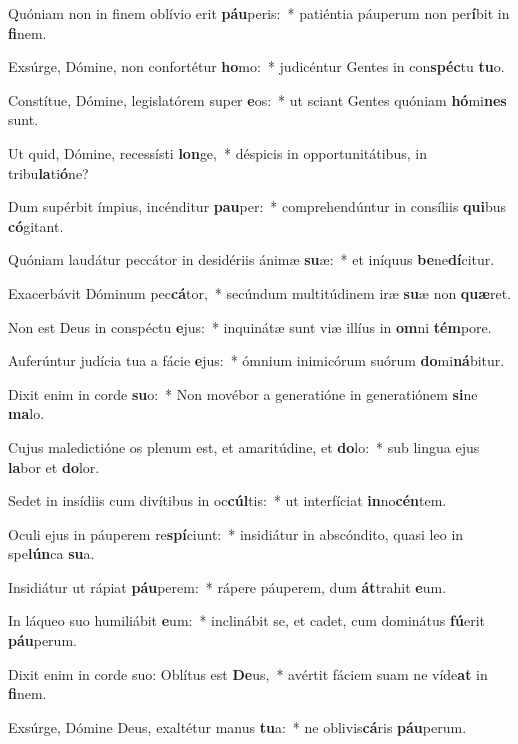 \item Quóniam non in finem oblívio erit \textbf{páu}peris:~* patiéntia páuperum non per\textbf{í}bit in \textbf{fi}nem.
\item Exsúrge, Dómine, non confortétur \textbf{ho}mo:~* judicéntur Gentes in con\textbf{spéc}tu \textbf{tu}o.
\item Constítue, Dómine, legislatórem super \textbf{e}os:~* ut sciant Gentes quóniam \textbf{hó}mi\textbf{nes} sunt.
\item Ut quid, Dómine, recessísti \textbf{lon}ge,~* déspicis in opportunitátibus, in tribu\textbf{la}ti\textbf{ó}ne?
\item Dum supérbit ímpius, incénditur \textbf{pau}per:~* comprehendúntur in consíliis \textbf{qui}bus \textbf{có}gitant.
\item Quóniam laudátur peccátor in desidériis ánimæ \textbf{su}æ:~* et iníquus \textbf{be}ne\textbf{dí}citur.
\item Exacerbávit Dóminum pec\textbf{cá}tor,~* secúndum multitúdinem iræ \textbf{su}æ non \textbf{quæ}ret.
\item Non est Deus in conspéctu \textbf{e}jus:~* inquinátæ sunt viæ illíus in \textbf{om}ni \textbf{tém}pore.
\item Auferúntur judícia tua a fácie \textbf{e}jus:~* ómnium inimicórum suórum \textbf{do}mi\textbf{ná}bitur.
\item Dixit enim in corde \textbf{su}o:~* Non movébor a generatióne in generatiónem \textbf{si}ne \textbf{ma}lo.
\item Cujus maledictióne os plenum est, et amaritúdine, et \textbf{do}lo:~* sub lingua ejus \textbf{la}bor et \textbf{do}lor.
\item Sedet in insídiis cum divítibus in oc\textbf{cúl}tis:~* ut interfíciat \textbf{in}no\textbf{cén}tem.
\item Oculi ejus in páuperem re\textbf{spí}ciunt:~* insidiátur in abscóndito, quasi leo in spe\textbf{lún}ca \textbf{su}a.
\item Insidiátur ut rápiat \textbf{páu}perem:~* rápere páuperem, dum \textbf{át}trahit \textbf{e}um.
\item In láqueo suo humiliábit \textbf{e}um:~* inclinábit se, et cadet, cum dominátus \textbf{fú}erit \textbf{páu}perum.
\item Dixit enim in corde suo: Oblítus est \textbf{De}us,~* avértit fáciem suam ne víde\textbf{at} in \textbf{fi}nem.
\item Exsúrge, Dómine Deus, exaltétur manus \textbf{tu}a:~* ne oblivis\textbf{cá}ris \textbf{páu}perum.

